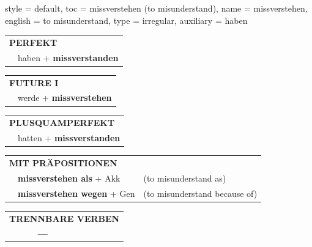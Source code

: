 \begin{verbentry}{
  style = {default},
  toc = {missverstehen (to misunderstand)},
  name = {missverstehen},
  english = {to misunderstand},
  type = {irregular},
  auxiliary = {haben}
}
 \begin{tabular}{rl}
     \multicolumn{2}{l}{\textbf{PERFEKT}}\\
   & haben + \textbf{missverstanden}\\
  \end{tabular}
\hfill
   \begin{tabular}{rl}
    \multicolumn{2}{l}{\textbf{FUTURE I} }\\
   & werde + \textbf{missverstehen}\\
  \end{tabular}
\hfill
   \begin{tabular}{rl}
      \multicolumn{2}{l}{\textbf{PLUSQUAMPERFEKT}}\\
   & hatten + \textbf{missverstanden}\\
  \end{tabular}

   \vspace{10pt}

   \begin{tabular}{lll}
      \multicolumn{3}{l}{\textbf{MIT PRÄPOSITIONEN}}\\
& \textbf{missverstehen als} + Akk & (to misunderstand as)\\
& \textbf{missverstehen wegen} + Gen & (to misunderstand because of)\\
\end{tabular}
  \hfill
   \begin{tabular}{lll}
\multicolumn{3}{l}{\textbf{TRENNBARE VERBEN}}\\
& \textbf{---} & \\
\end{tabular}

  \vspace{-5pt}
\end{verbentry}
